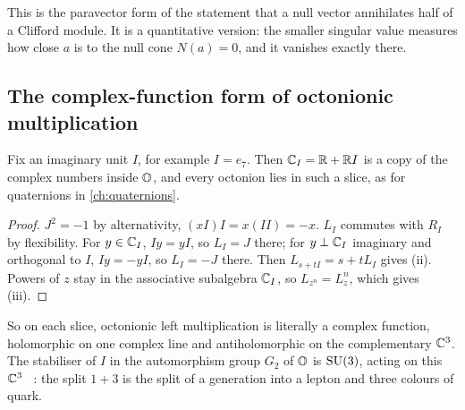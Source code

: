 This is the paravector form of the statement that a null vector annihilates half of a Clifford module. It is a quantitative version: the smaller singular value measures how close $a$ is to the null cone $N(a)=0$, and it vanishes exactly there.

\subsection*{The complex-function form of octonionic multiplication}

Fix an imaginary unit $I$, for example $I=e_7$. Then $\mathbb{C}_I=\mathbb{R}+\mathbb{R} I$ is a copy of the complex numbers inside $\mathbb{O}$, and every octonion lies in such a slice, as for quaternions in \cref{ch:quaternions}.


\begin{proof}
$J^2=-1$ by alternativity, $(xI)I=x(II)=-x$. $L_I$ commutes with $R_I$ by flexibility. For $y\in\mathbb{C}_I$, $Iy=yI$, so $L_I=J$ there; for $y\perp\mathbb{C}_I$ imaginary and orthogonal to $I$, $Iy=-yI$, so $L_I=-J$ there. Then $L_{s+tI}=s+tL_I$ gives (ii). Powers of $z$ stay in the associative subalgebra $\mathbb{C}_I$, so $L_{z^n}=L_z^n$, which gives (iii).
\end{proof}

So on each slice, octonionic left multiplication is literally a complex function, holomorphic on one complex line and antiholomorphic on the complementary $\mathbb{C}^3$. The stabiliser of $I$ in the automorphism group $G_2$ of $\mathbb{O}$ is $\mathrm{SU}(3)$, acting on this $\mathbb{C}^3$ \ext\ \cite{GunaydinGursey1973}: the split $1+3$ is the split of a generation into a lepton and three colours of quark.

